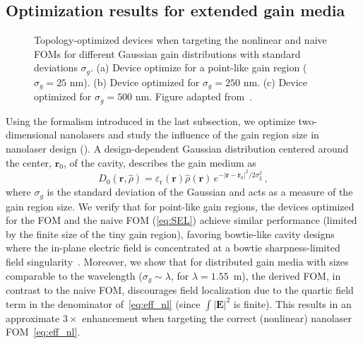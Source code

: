 \subsection*{Optimization results for extended gain media}

\begin{figure}[tb]
    \centering
    \caption{Topology-optimized devices when targeting the nonlinear and naive FOMs for different Gaussian gain distributions with standard deviations $\sigma_g$. (a) Device optimize for a point-like gain region ($\sigma_g=25$ nm).
    (b) Device optimized for $\sigma_g=250$ nm. (c) Device optimized for $\sigma_g=500$ nm. Figure adapted from~\cite{ownpub4}.}
    \label{fig:laser_size}
\end{figure}

Using the formalism introduced in the last subsection, we optimize two-dimensional nanolasers and study the influence of the gain region size in 
nanolaser design (). A design-dependent Gaussian distribution centered around the center, $\mathbf{r}_0$, of the cavity, describes the gain medium as
\begin{equation}
D_0 (\mathbf{r}, \hat{\rho}) = \varepsilon_{\text{r}}(\mathbf{r})  \hat{\rho}(\mathbf{r}) \, e^{- \vert \mathbf{r}- \mathbf{r}_0 \vert^2 / 2 \sigma_{\text{g}}^2 }\,,
\end{equation}
where
$\sigma_g$ is the standard deviation of the Gaussian and acts as a measure of the gain region size. We verify that for point-like gain regions, the devices optimized for the FOM and the naive FOM (\eqref{eq:SEL})
achieve similar performance (limited by the finite size of the tiny gain region), favoring bowtie-like cavity designs
where the in-plane electric field is concentrated at a bowtie sharpness-limited field singularity~\cite{sing}. Moreover, we show that for distributed gain media with sizes comparable to the wavelength 
($\sigma_g \sim \lambda$, for $\lambda = 1.55$~\textmu m), 
the derived FOM, in contrast to the naive FOM, discourages field localization due to the quartic field term in the denominator of~\eqref{eq:eff_nl} 
(since $\int |\mathbf{E}|^2$ is finite). 
This results in an approximate $3\times$ enhancement when targeting the correct (nonlinear) nanolaser FOM~\eqref{eq:eff_nl}.

